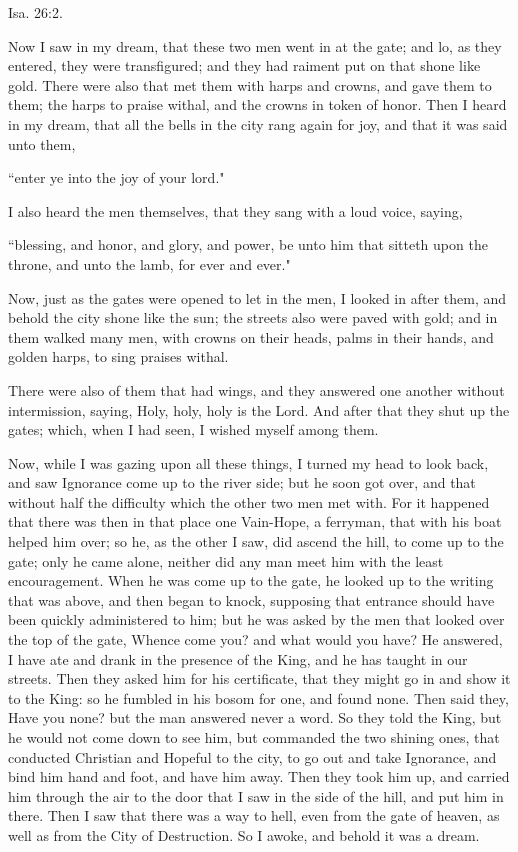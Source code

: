 Isa. 26:2.

Now I saw in my dream, that these two men went in at the gate; and lo, as they entered, they were transfigured; and they had raiment put on that shone like gold. There were also that met them with harps and crowns, and gave them to them; the harps to praise withal, and the crowns in token of honor. Then I heard in my dream, that all the bells in the city rang again for joy, and that it was said unto them,

``enter ye into the joy of your lord."

I also heard the men themselves, that they sang with a loud voice, saying,

``blessing, and honor, and glory, and power, be unto him that sitteth upon the throne, and unto the lamb, for ever and ever."

Now, just as the gates were opened to let in the men, I looked in after them, and behold the city shone like the sun; the streets also were paved with gold; and in them walked many men, with crowns on their heads, palms in their hands, and golden harps, to sing praises withal.

There were also of them that had wings, and they answered one another without intermission, saying, Holy, holy, holy is the Lord. And after that they shut up the gates; which, when I had seen, I wished myself among them.

Now, while I was gazing upon all these things, I turned my head to look back, and saw Ignorance come up to the river side; but he soon got over, and that without half the difficulty which the other two men met with. For it happened that there was then in that place one Vain-Hope, a ferryman, that with his boat helped him over; so he, as the other I saw, did ascend the hill, to come up to the gate; only he came alone, neither did any man meet him with the least encouragement. When he was come up to the gate, he looked up to the writing that was above, and then began to knock, supposing that entrance should have been quickly administered to him; but he was asked by the men that looked over the top of the gate, Whence come you? and what would you have? He answered, I have ate and drank in the presence of the King, and he has taught in our streets. Then they asked him for his certificate, that they might go in and show it to the King: so he fumbled in his bosom for one, and found none. Then said they, Have you none? but the man answered never a word. So they told the King, but he would not come down to see him, but commanded the two shining ones, that conducted Christian and Hopeful to the city, to go out and take Ignorance, and bind him hand and foot, and have him away. Then they took him up, and carried him through the air to the door that I saw in the side of the hill, and put him in there. Then I saw that there was a way to hell, even from the gate of heaven, as well as from the City of Destruction. So I awoke, and behold it was a dream. 
